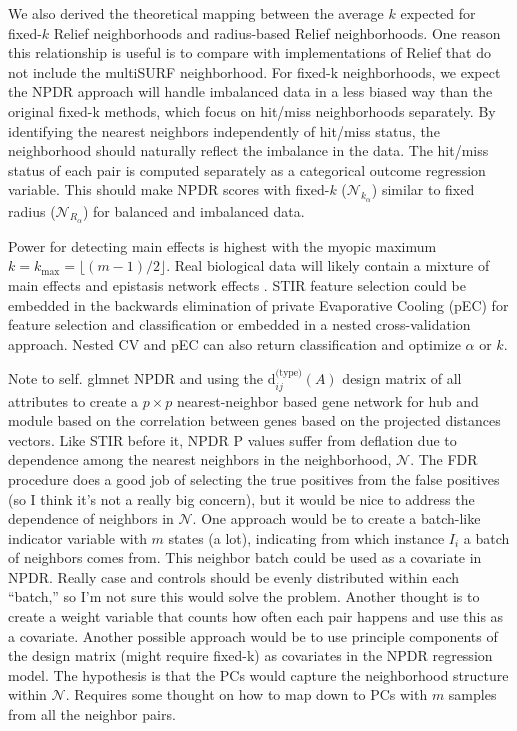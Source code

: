 \documentclass[10pt]{article}
\begin{document}
We also derived the theoretical mapping between the average $k$ expected for fixed-$k$ Relief neighborhoods and radius-based Relief neighborhoods. One reason this relationship is useful is to compare with implementations of Relief that do not include the multiSURF neighborhood. For fixed-k neighborhoods, we expect the NPDR approach will handle imbalanced data in a less biased way than the original fixed-k methods, which focus on hit/miss neighborhoods separately. By identifying the nearest neighbors independently of hit/miss status, the neighborhood should naturally reflect the imbalance in the data. The hit/miss status of each pair is computed separately as a categorical outcome regression variable. This should make NPDR scores with fixed-$k$ ($\mathcal{N}_{k_\alpha}$) similar to fixed radius ($\mathcal{N}_{R_\alpha}$) for balanced and imbalanced data.    

Power for detecting main effects is highest with the myopic maximum $k=k_{\text{max}}=\lfloor (m-1)/2\rfloor$. Real biological data will likely contain a mixture of main effects and epistasis network effects \cite{mckinney_pajewski}. STIR feature selection could be embedded in the backwards elimination of private Evaporative Cooling (pEC) for feature selection and classification \cite{le17} or embedded in a nested cross-validation approach. Nested CV and pEC can also return classification and optimize $\alpha$ or $k$. 


Note to self. glmnet NPDR and using the $\text{d}^{\text{(type)}}_{ij}(A)$ design matrix of all attributes to create a $p \times p$ nearest-neighbor based gene network for hub and module based on the correlation between genes based on the projected distances vectors. Like STIR before it, NPDR P values suffer from deflation due to dependence among the nearest neighbors in the neighborhood, $\mathcal{N}$. The FDR procedure does a good job of selecting the true positives from the false positives (so I think it's not a really big concern), but it would be nice to address the dependence of neighbors in $\mathcal{N}$. One approach would be to create a batch-like indicator variable with $m$ states (a lot), indicating from which instance $I_i$ a batch of neighbors comes from. This neighbor batch could be used as a covariate in NPDR. Really case and controls should be evenly distributed within each ``batch,'' so I'm not sure this would solve the problem. Another thought is to create a weight variable that counts how often each pair happens and use this as a covariate. Another possible approach would be to use principle components of the design matrix (might require fixed-k) as covariates in the NPDR regression model. The hypothesis is that the PCs would capture the neighborhood structure within $\mathcal{N}$. Requires some thought on how to map down to PCs with $m$ samples from all the neighbor pairs.   
\end{document}
